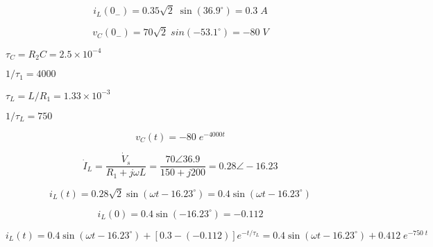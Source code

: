 {\newpage\clearpage
{}%
\begin{displaymath} i_L(0_-)=0.35\sqrt{2}\;\sin(36.9^\circ)=0.3\;A \end{displaymath}%
\lthtmldisplayZ
\lthtmlcheckvsize\clearpage}

{\newpage\clearpage
{}%
\begin{displaymath} v_C(0_-)=70\sqrt{2}\;sin(-53.1^\circ)=-80\;V \end{displaymath}%
\lthtmldisplayZ
\lthtmlcheckvsize\clearpage}

{\newpage\clearpage
{}%
$\tau_C=R_2C=2.5\times 10^{-4}$%
\lthtmlinlinemathZ
\lthtmlcheckvsize\clearpage}

{\newpage\clearpage
{}%
$1/\tau_1=4000$%
\lthtmlinlinemathZ
\lthtmlcheckvsize\clearpage}

{\newpage\clearpage
{}%
$\tau_L=L/R_1=1.33\times 10^{-3}$%
\lthtmlinlinemathZ
\lthtmlcheckvsize\clearpage}

{\newpage\clearpage
{}%
$1/\tau_L=750$%
\lthtmlinlinemathZ
\lthtmlcheckvsize\clearpage}

{\newpage\clearpage
{}%
\begin{displaymath} v_C(t)=-80\;e^{-4000  t} \end{displaymath}%
\lthtmldisplayZ
\lthtmlcheckvsize\clearpage}

{\newpage\clearpage
{}%
\begin{displaymath} \dot{I}_L=\frac{\dot{V}_s}{R_1+j\omega L}=\frac{70\angle 36.9}{150+j200}
=0.28\angle -16.23 \end{displaymath}%
\lthtmldisplayZ
\lthtmlcheckvsize\clearpage}

{\newpage\clearpage
{}%
\begin{displaymath} i_L(t)=0.28\sqrt{2}\sin(\omega t-16.23^\circ)=0.4\sin(\omega t-16.23^\circ) \end{displaymath}%
\lthtmldisplayZ
\lthtmlcheckvsize\clearpage}

{\newpage\clearpage
{}%
\begin{displaymath} i_L(0)=0.4\sin(-16.23^\circ)=-0.112 \end{displaymath}%
\lthtmldisplayZ
\lthtmlcheckvsize\clearpage}

{\newpage\clearpage
{}%
\begin{displaymath} i_L(t)=0.4\sin(\omega t-16.23^\circ)+[0.3-(-0.112)]e^{-t/\tau_L}
=0.4\sin(\omega t-16.23^\circ)+0.412\;e^{-750\;t} \end{displaymath}%
\lthtmldisplayZ
\lthtmlcheckvsize\clearpage}

